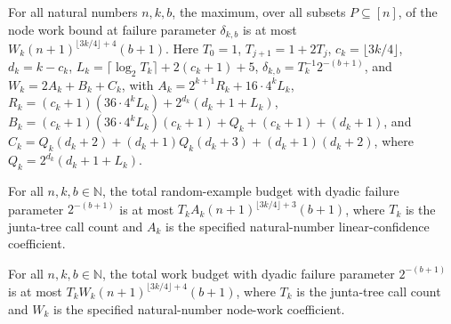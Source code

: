 \begin{theorem}
\label{FABL.lowDegreeJuntaNodeUniformWorkBound_le_linearConfidence}
\leanok
{}
For all natural numbers $n,k,b$, the maximum, over all subsets $P\subseteq[n]$, of the
node work bound at failure parameter $\delta_{k,b}$ is at most
$W_k(n+1)^{\lfloor3k/4\rfloor+4}(b+1)$. Here $T_0=1$, $T_{j+1}=1+2T_j$,
$c_k=\lfloor3k/4\rfloor$, $d_k=k-c_k$, $L_k=\lceil\log_2T_k\rceil+2(c_k+1)+5$,
$\delta_{k,b}=T_k^{-1}2^{-(b+1)}$, and $W_k=2A_k+B_k+C_k$, with
$A_k=2^{k+1}R_k+16\cdot4^kL_k$, $R_k=(c_k+1)(36\cdot4^kL_k)+2^{d_k}(d_k+1+L_k)$,
$B_k=(c_k+1)(36\cdot4^kL_k)(c_k+1)+Q_k+(c_k+1)+(d_k+1)$, and
$C_k=Q_k(d_k+2)+(d_k+1)Q_k(d_k+3)+(d_k+1)(d_k+2)$, where $Q_k=2^{d_k}(d_k+1+L_k)$.
\end{theorem}

\begin{theorem}
\label{FABL.lowDegreeJuntaTotalRandomExampleBudget_le_linearConfidence}
\leanok
{}
For all $n,k,b\in\mathbb{N}$, the total random-example budget with dyadic failure
parameter $2^{-(b+1)}$ is at most $T_k A_k(n+1)^{\lfloor 3k/4\rfloor+3}(b+1)$, where
$T_k$ is the junta-tree call count and $A_k$ is the specified natural-number
linear-confidence coefficient.
\end{theorem}

\begin{theorem}
\label{FABL.lowDegreeJuntaTotalWorkBudget_le_linearConfidence}
\leanok
{}
For all $n,k,b\in\mathbb{N}$, the total work budget with dyadic failure parameter
$2^{-(b+1)}$ is at most $T_k W_k(n+1)^{\lfloor 3k/4\rfloor+4}(b+1)$, where $T_k$ is the
junta-tree call count and $W_k$ is the specified natural-number node-work coefficient.
\end{theorem}

